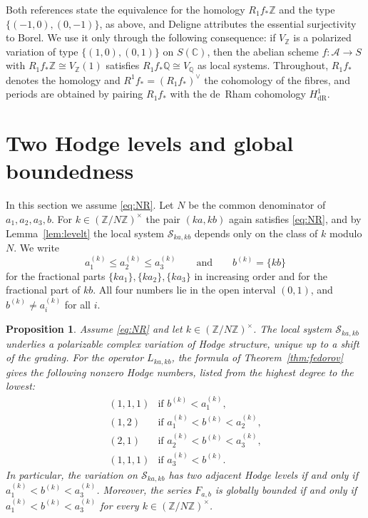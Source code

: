 \documentclass[11pt]{amsart}
\newtheorem{proposition}[theorem]{Proposition}
\theoremstyle{definition}
\theoremstyle{remark}
\numberwithin{equation}{section}
\newcommand{\Q}{\mathbb{Q}}
\newcommand{\Z}{\mathbb{Z}}
\newcommand{\C}{\mathbb{C}}
\newcommand{\cS}{\mathcal{S}}
\newcommand{\cA}{\mathcal{A}}
\newcommand{\ak}[1]{a^{(k)}_{#1}}
\newcommand{\bk}{b^{(k)}}
\newcommand{\Fab}{F_{a,b}}
\begin{document}
Both references state the equivalence for the homology $R_1f_*\Z$ and the type $\{(-1,0),(0,-1)\}$, as above, and Deligne attributes the essential surjectivity to Borel. We use it only through the following consequence: if $V_\Z$ is a polarized variation of type $\{(1,0),(0,1)\}$ on $S(\C)$, then the abelian scheme $f:\cA\to S$ with $R_1f_*\Z\cong V_\Z(1)$ satisfies $R_1f_*\Q\cong V_\Q$ as local systems. Throughout, $R_1f_*$ denotes the homology and $R^1f_*=(R_1f_*)^\vee$ the cohomology of the fibres, and periods are obtained by pairing $R_1f_*$ with the de~Rham cohomology $H^1_{\mathrm{dR}}$.

\section{Two Hodge levels and global boundedness}\label{sec:twolevel}

In this section we assume \eqref{eq:NR}. Let $N$ be the common denominator of $a_1,a_2,a_3,b$. For $k\in(\Z/N\Z)^\times$ the pair $(ka,kb)$ again satisfies \eqref{eq:NR}, and by Lemma~\ref{lem:levelt} the local system $\cS_{ka,kb}$ depends only on the class of $k$ modulo $N$. We write
\[
\ak1\le\ak2\le\ak3\qquad\text{and}\qquad\bk=\{kb\}
\]
for the fractional parts $\{ka_1\},\{ka_2\},\{ka_3\}$ in increasing order and for the fractional part of $kb$. All four numbers lie in the open interval $(0,1)$, and $\bk\ne\ak i$ for all $i$.

\begin{proposition}\label{prop:twolevel}
Assume \eqref{eq:NR} and let $k\in(\Z/N\Z)^\times$. The local system $\cS_{ka,kb}$ underlies a polarizable complex variation of Hodge structure, unique up to a shift of the grading. For the operator $L_{ka,kb}$, the formula of Theorem~\ref{thm:fedorov} gives the following nonzero Hodge numbers, listed from the highest degree to the lowest:
\[
\begin{array}{ll}
(1,1,1) & \text{if } \bk<\ak1,\\[1pt]
(1,2) & \text{if } \ak1<\bk<\ak2,\\[1pt]
(2,1) & \text{if } \ak2<\bk<\ak3,\\[1pt]
(1,1,1) & \text{if } \ak3<\bk.
\end{array}
\]
In particular, the variation on $\cS_{ka,kb}$ has two adjacent Hodge levels if and only if $\ak1<\bk<\ak3$. Moreover, the series $\Fab$ is globally bounded if and only if $\ak1<\bk<\ak3$ for every $k\in(\Z/N\Z)^\times$.
\end{proposition}
\end{document}

